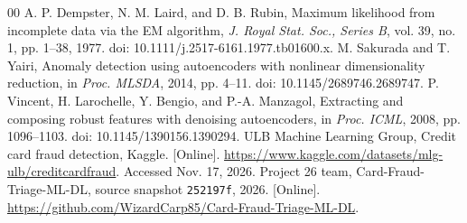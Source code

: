 \documentclass[conference]{IEEEtran}
\begin{document}
\balance
\begin{thebibliography}{00}
 A. P. Dempster, N. M. Laird, and D. B. Rubin, Maximum likelihood from incomplete data via the EM algorithm, \emph{J. Royal Stat. Soc., Series B}, vol. 39, no. 1, pp. 1--38, 1977. doi: 10.1111/j.2517-6161.1977.tb01600.x.
 M. Sakurada and T. Yairi, Anomaly detection using autoencoders with nonlinear dimensionality reduction, in \emph{Proc. MLSDA}, 2014, pp. 4--11. doi: 10.1145/2689746.2689747.
 P. Vincent, H. Larochelle, Y. Bengio, and P.-A. Manzagol, Extracting and composing robust features with denoising autoencoders, in \emph{Proc. ICML}, 2008, pp. 1096--1103. doi: 10.1145/1390156.1390294.
 ULB Machine Learning Group, Credit card fraud detection, Kaggle. [Online]. \url{https://www.kaggle.com/datasets/mlg-ulb/creditcardfraud}. Accessed Nov. 17, 2026.
 Project 26 team, Card-Fraud-Triage-ML-DL, source snapshot \texttt{252197f}, 2026. [Online]. \url{https://github.com/WizardCarp85/Card-Fraud-Triage-ML-DL}.
\end{thebibliography}
\end{document}
